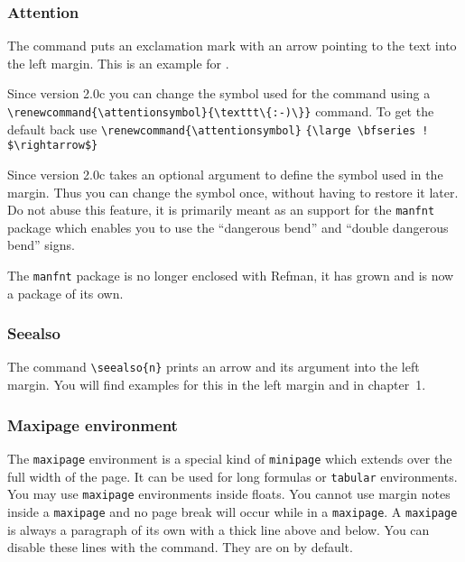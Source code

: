 \subsubsection{Attention}

The command  puts an exclamation mark with an arrow 
pointing to the text into the left margin.\attention{} This is an 
example for .

\renewcommand{\attentionsymbol}{\texttt{:-)}}
\attention
Since version 2.0c you can change the symbol used for the 
 command using a 
\verb|\renewcommand{\attentionsymbol}{\texttt\{:-)\}}|
command. To get the default back use
\verb|\renewcommand{\attentionsymbol}| \verb|{\large \bfseries ! $\rightarrow$}|
\renewcommand{\attentionsymbol}{\large \bfseries ! $\rightarrow$}

Since version 2.0c  takes an optional argument to define the
symbol used in the margin. Thus you can change the symbol once, without
having to restore it later. Do not abuse this
feature\attention[\texttt{:-(}], it is primarily meant as an support for the
\texttt{manfnt} package which enables you to use the ``dangerous bend'' and
``double dangerous bend'' signs.

The \texttt{manfnt} package is no longer enclosed with Refman, it
has grown and is now a package of its own.

\subsubsection{Seealso}

The command \verb|\seealso{n}| prints an arrow and its argument into 
the left margin. You will find examples for this in the left margin 
and in  chapter~1.

\subsubsection{Maxipage environment}

The \texttt{maxipage} environment is a special kind of \texttt{minipage}
which extends over the full width of the page. It can be used for long
formulas or \texttt{tabular} environments. You may use \texttt{maxipage}
environments inside floats. You cannot use margin notes inside a
\texttt{maxipage} and no page break will occur while in a \texttt{maxipage}.
A \texttt{maxipage} is always a paragraph of its own with a thick line above
and below. You can disable these lines with the
 command. They are on by default.

